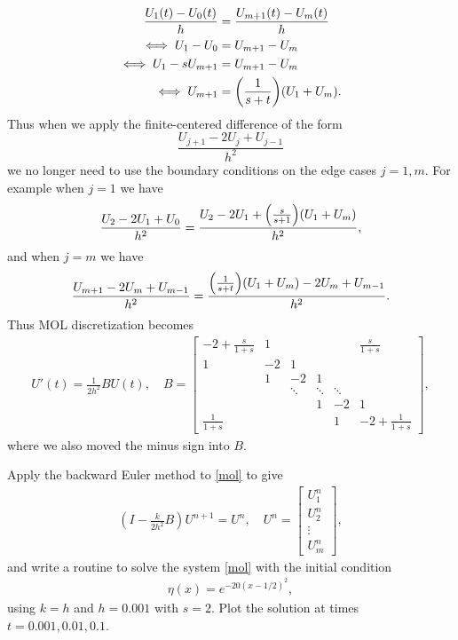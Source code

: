 \documentclass[12pt]{report}
\begin{document}
\begin{solution}
\begin{align*}
    \frac{U_{1}(t) - U_0(t)}{h} &= \frac{U_{m+1}(t) - U_m(t)}{h}\\
    \iff U_1 - U_0 &= U_{m+1} - U_m\\
    \iff U_1 - sU_{m+1} &= U_{m+1} - U_m\\
    \iff U_{m+1} &= {\left(\frac{1}{s+t}\right)}{\left(U_1 + U_m\right)}.
  \end{align*}
  Thus when we apply the finite-centered difference of the form
  \[ 
    \frac{U_{j+1} - 2U_j + U_{j-1}}{h^2}
  \]
  we no longer need to use the boundary conditions on the edge cases $j=1,m$. For example when $j=1$ we have
  \[ 
    \frac{U_{2} - 2U_{1} + U_{0}}{h^2} = \frac{U_{2} - 2U_{1} + {\left(\frac{s}{s+1}\right)}{\left(U_1 + U_m\right)}}{h^2},
  \]
  and when $j=m$ we have
  \[ 
    \frac{U_{m+1} - 2U_m + U_{m-1}}{h^2} = \frac{{\left(\frac{1}{s+t}\right)}{\left(U_1 + U_m\right)} - 2U_m + U_{m-1}}{h^2}.
  \]
  Thus MOL discretization becomes
  \begin{align*}
    U'(t) = \frac{1}{2h^2} B U(t), \quad B = \begin{bmatrix}
    -2 + \frac{s}{1 + s} & 1 &&&& \frac{s}{1 + s}\\
    1 & -2 & 1 \\
    & 1 & -2 & 1 & \\
    &&\ddots & \ddots & \ddots \\
    &&&1 & -2 & 1 \\
    \frac{1}{1+s} &&&& 1 & -2 + \frac{1}{1+s} \end{bmatrix},
  \end{align*}
  where we also moved the minus sign into $B$.
\end{solution}

\newpage



\begin{problem}
    Apply the backward Euler method to \eqref{mol} to give
  \begin{align}\label{be}
    \left( I - \frac{k}{2h^2}B \right) U^{n+1} =  U^n, \quad U^n = \begin{bmatrix} U_1^n \\ U_2^n \\ \vdots \\U_m^n \end{bmatrix},
  \end{align}
  and write a routine to solve the system \eqref{mol} with the initial condition
  \begin{align*}
    \eta(x) = e^{-20(x-1/2)^2},
  \end{align*}
  using $k = h$ and $h = 0.001$ with $s = 2$.  Plot the solution at times $t = 0.001,0.01,0.1$.
\end{problem}
\end{document}

